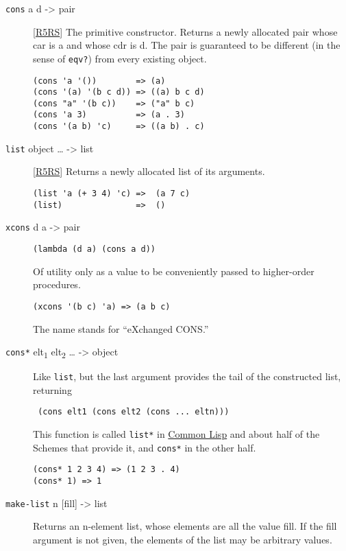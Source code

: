 \begin{description}
\item[ \href{}{} \texttt{cons} a d -\textgreater{} pair ]
{[}\protect\hyperlink{R5RS}{R5RS}{]} The primitive constructor. Returns
a newly allocated pair whose car is a and whose cdr is d. The pair is
guaranteed to be different (in the sense of \texttt{eqv?}) from every
existing object.

\begin{verbatim}
(cons 'a '())        => (a)
(cons '(a) '(b c d)) => ((a) b c d)
(cons "a" '(b c))    => ("a" b c)
(cons 'a 3)          => (a . 3)
(cons '(a b) 'c)     => ((a b) . c)
\end{verbatim}
\item[ \href{}{} \texttt{list} object \ldots{} -\textgreater{} list ]
{[}\protect\hyperlink{R5RS}{R5RS}{]} Returns a newly allocated list of
its arguments.

\begin{verbatim}
(list 'a (+ 3 4) 'c) =>  (a 7 c)
(list)               =>  ()
\end{verbatim}
\item[ \href{}{} \texttt{xcons} d a -\textgreater{} pair ]
\begin{verbatim}
(lambda (d a) (cons a d))
\end{verbatim}

Of utility only as a value to be conveniently passed to higher-order
procedures.

\begin{verbatim}
(xcons '(b c) 'a) => (a b c)
\end{verbatim}

The name stands for ``eXchanged CONS.'' \href{}{}
\item[\texttt{cons*} elt\textsubscript{1} elt\textsubscript{2} \ldots{}
-\textgreater{} object ]
Like \texttt{list}, but the last argument provides the tail of the
constructed list, returning

\texttt{\ (cons\ elt1\ (cons\ elt2\ (cons\ ...\ eltn)))\ \ \ \ \ }

This function is called \texttt{list*} in
\protect\hyperlink{CommonLisp}{Common Lisp} and about half of the
Schemes that provide it, and \texttt{cons*} in the other half.

\begin{verbatim}
(cons* 1 2 3 4) => (1 2 3 . 4)
(cons* 1) => 1
\end{verbatim}

\href{}{}
\item[ \texttt{make-list} n {[}fill{]} -\textgreater{} list ]
Returns an n-element list, whose elements are all the value fill. If the
fill argument is not given, the elements of the list may be arbitrary
values.


\end{description}
